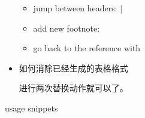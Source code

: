 \documentclass[letterpaper,12pt,english]{sphinxmanual}
\begin{document}
\begin{itemize}
\begin{itemize}
\item {} 
jump between headers:  | 

\item {} 
add new footnote: 

\item {} 
go back to the reference with 

\end{itemize}

\item {} 
如何消除已经生成的表格格式

进行两次替换动作就可以了。

\begin{sphinxVerbatim}[commandchars=\\\{\}]
\PYG{p}{[}\PYGZbs{}\PYG{p}{]}
\PYGZbs{}\PYGZbs{}
\end{sphinxVerbatim}

\end{itemize}

\sphinxhyphen{}usage snippets
\end{document}
